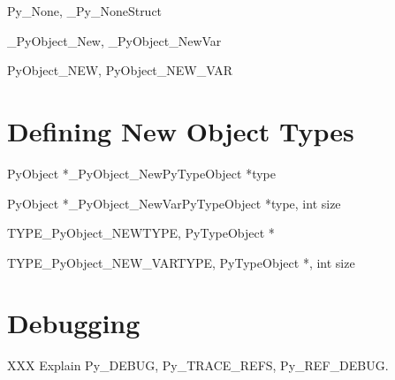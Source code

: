 \documentclass[twoside,openright]{report}
\begin{document}
Py_None, _Py_NoneStruct

_PyObject_New, _PyObject_NewVar

PyObject_NEW, PyObject_NEW_VAR


\chapter{Defining New Object Types}

\begin{cfuncdesc}{PyObject *}{_PyObject_New}{PyTypeObject *type}
\end{cfuncdesc}

\begin{cfuncdesc}{PyObject *}{_PyObject_NewVar}{PyTypeObject *type, int size}
\end{cfuncdesc}

\begin{cfuncdesc}{TYPE}{_PyObject_NEW}{TYPE, PyTypeObject *}
\end{cfuncdesc}

\begin{cfuncdesc}{TYPE}{_PyObject_NEW_VAR}{TYPE, PyTypeObject *, int size}
\end{cfuncdesc}


\chapter{Debugging}

XXX Explain Py_DEBUG, Py_TRACE_REFS, Py_REF_DEBUG.


\end{document}
